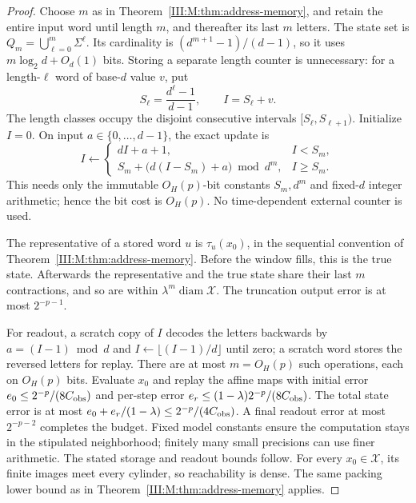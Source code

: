 \begin{proof}
Choose $m$ as in Theorem~\ref{III:M:thm:address-memory}, and retain the
entire input word until length $m$, and thereafter its last $m$
letters. The state set is $Q_m=\bigcup_{\ell=0}^m\Sigma^\ell$.
Its cardinality is $(d^{m+1}-1)/(d-1)$, so it uses
$m\log_2d+O_d(1)$ bits. Storing a separate length counter is
unnecessary: for a length-$\ell$ word of base-$d$ value $v$, put
\[
 S_\ell=\frac{d^\ell-1}{d-1},\qquad I=S_\ell+v.
\]
The length classes occupy the disjoint consecutive intervals
$[S_\ell,S_{\ell+1})$. Initialize $I=0$. On input
$a\in\{0,\ldots,d-1\}$, the exact update is
\[
 I\leftarrow
 \begin{cases}
 dI+a+1,&I<S_m,\\
 S_m+\big(d(I-S_m)+a\big)\bmod d^m,&I\ge S_m.
 \end{cases}
\]
This needs only the immutable $O_H(p)$-bit constants $S_m,d^m$
and fixed-$d$ integer arithmetic; hence the bit cost is $O_H(p)$.
No time-dependent external counter is used.

The representative of a stored word $u$ is $\tau_u(x_0)$, in the
sequential convention of Theorem~\ref{III:M:thm:address-memory}.
Before the window fills, this is the true state. Afterwards the
representative and the true state share their last $m$ contractions,
and so are within $\lambda^m\operatorname{diam}\mathcal X$.
The truncation output error is at most $2^{-p-1}$.

For readout, a scratch copy of $I$ decodes the letters backwards by
$a=(I-1)\bmod d$ and $I\leftarrow\lfloor(I-1)/d\rfloor$
until zero; a scratch word stores the reversed letters for replay.
There are at most $m=O_H(p)$ such operations, each on $O_H(p)$ bits.
Evaluate $x_0$ and replay the affine maps with initial error
$e_0\le 2^{-p}/(8C_{\rm obs})$ and per-step error
$e_r\le(1-\lambda)2^{-p}/(8C_{\rm obs})$.
The total state error is at most
$e_0+e_r/(1-\lambda)\le2^{-p}/(4C_{\rm obs})$.
A final readout error at most $2^{-p-2}$ completes the budget.
Fixed model constants ensure the computation stays in the stipulated
neighborhood; finitely many small precisions can use finer arithmetic.
The stated storage and readout bounds follow.
For every $x_0\in\mathcal X$, its finite images meet every cylinder,
so reachability is dense. The same packing lower bound as in
Theorem~\ref{III:M:thm:address-memory} applies.
\end{proof}
